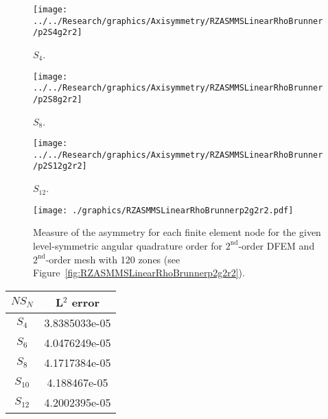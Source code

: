 \documentclass[12pt]{article}
\begin{document}
\begin{sidewaysfigure}[!htb]
\centering
\begin{subfigure}{0.33\textwidth}
\texttt{[image: ../../Research/graphics/Axisymmetry/RZASMMSLinearRhoBrunner/p2S4g2r2]}
\caption{$S_4$.}
\end{subfigure}%
\begin{subfigure}{0.33\textwidth}
\texttt{[image: ../../Research/graphics/Axisymmetry/RZASMMSLinearRhoBrunner/p2S8g2r2]}
\caption{$S_8$.}
\end{subfigure}%
\begin{subfigure}{0.33\textwidth}
\texttt{[image: ../../Research/graphics/Axisymmetry/RZASMMSLinearRhoBrunner/p2S12g2r2]}
\caption{$S_{12}$.}
\end{subfigure}
\caption{Relative asymmetry for $2^\text{nd}$-order finite elements on a $2^\text{nd}$-order mesh for given order of level-symmetric angular quadrature.}
\label{fig:RZASMMSLinearRhoBrunnerp2g2r2}
\end{sidewaysfigure}

\begin{figure}[!htb]
\centering
\texttt{[image: ./graphics/RZASMMSLinearRhoBrunnerp2g2r2.pdf]}
\caption{Measure of the asymmetry for each finite element node for the given level-symmetric angular quadrature order for $2^\text{nd}$-order DFEM and $2^\text{nd}$-order mesh with 120 zones (see Figure~\ref{fig:RZASMMSLinearRhoBrunnerp2g2r2}).}
\label{fig:RZASMMSLinearRhoBrunnerp2g2r2Nodes}
\end{figure}

\begin{table}[!htb]
\centering
{\renewcommand{\arraystretch}{1.5}
\begin{tabular}{|c|c|}
\hline
$NS_N$ & L$^2$ error \\\hline
$S_4$ & 3.8385033e-05 \\\hline
$S_6$ & 4.0476249e-05 \\\hline
$S_8$ & 4.1717384e-05 \\\hline
$S_{10}$ & 4.188467e-05 \\\hline
$S_{12}$ & 4.2002395e-05 \\\hline
\end{tabular}}
\end{table}
\end{document}
